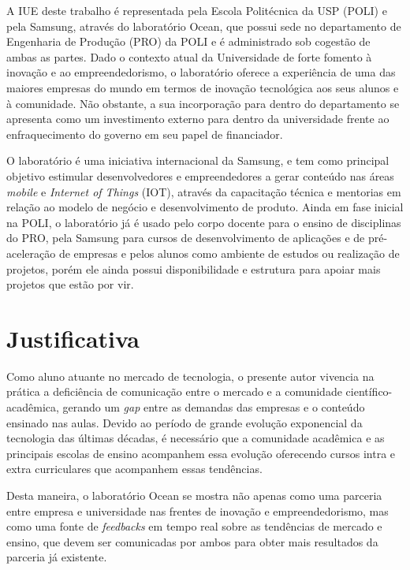 A IUE deste trabalho é representada pela Escola Politécnica da USP (POLI) e pela Samsung, através do laboratório Ocean, que possui sede no departamento de Engenharia de Produção (PRO) da POLI e é administrado sob cogestão de ambas as partes. Dado o contexto atual da Universidade de forte fomento à inovação e ao empreendedorismo, o laboratório oferece a experiência de uma das maiores empresas do mundo em termos de inovação tecnológica aos seus alunos e à comunidade. Não obstante, a sua incorporação para dentro do departamento se apresenta como um investimento externo para dentro da universidade frente ao enfraquecimento do governo em seu papel de financiador.

O laboratório é uma iniciativa internacional da Samsung, e tem como principal objetivo estimular desenvolvedores e empreendedores a gerar conteúdo nas áreas \textit{mobile} e \textit{Internet of Things} (IOT), através da capacitação técnica e mentorias em relação ao modelo de negócio e desenvolvimento de produto. Ainda em fase inicial na POLI, o laboratório já é usado pelo corpo docente para o ensino de disciplinas do PRO, pela Samsung para cursos de desenvolvimento de aplicações e de pré-aceleração de empresas e pelos alunos como ambiente de estudos ou realização de projetos, porém ele ainda possui disponibilidade e estrutura para apoiar mais projetos que estão por vir.

\section{Justificativa}
\label{cha:justificativa}

Como aluno atuante no mercado de tecnologia, o presente autor vivencia na prática a deficiência de comunicação entre o mercado e a comunidade científico-acadêmica, gerando um \textit{gap} entre as demandas das empresas e o conteúdo ensinado nas aulas. Devido ao período de grande evolução exponencial da tecnologia das últimas décadas, é necessário que a comunidade acadêmica e as principais escolas de ensino acompanhem essa evolução oferecendo cursos intra e extra curriculares que acompanhem essas tendências.

Desta maneira, o laboratório Ocean se mostra não apenas como uma parceria entre empresa e universidade nas frentes de inovação e empreendedorismo, mas como uma fonte de \textit{feedbacks} em tempo real sobre as tendências de mercado e ensino, que devem ser comunicadas por ambos para obter mais resultados da parceria já existente.

